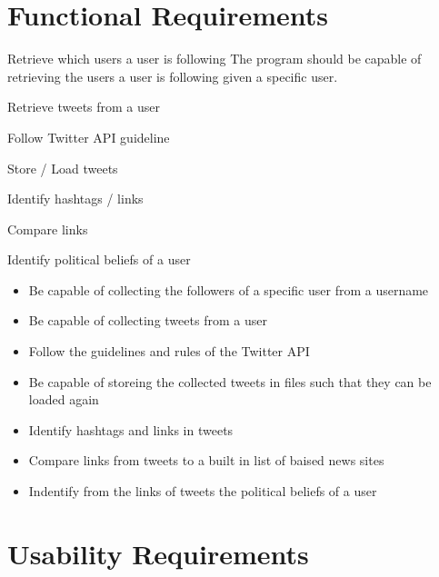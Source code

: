 \section{Functional Requirements}

\begin{requirement}{Retrieve which users a user is following}
The program should be capable of retrieving the users a user is
following given a specific user.
\end{requirement}

\begin{requirement}{Retrieve tweets from a user}

\end{requirement}

\begin{requirement}{Follow Twitter API guideline}

\end{requirement}

\begin{requirement}{Store / Load tweets}

\end{requirement}

\begin{requirement}{Identify hashtags / links}

\end{requirement}

\begin{requirement}{Compare links}

\end{requirement}

\begin{requirement}{Identify political beliefs of a user }

\end{requirement}
\begin{itemize}
 \item Be capable of collecting the followers of a specific user from a username
 \item Be capable of collecting tweets from a user
 \item Follow the guidelines and rules of the Twitter API
 \item Be capable of storeing the collected tweets in files such that they can
 be loaded again
 \item Identify hashtags and links in tweets
 \item Compare links from tweets to a built in list of baised news sites
 \item Indentify from the links of tweets the political beliefs of a user
\end{itemize}

\section{Usability Requirements}

